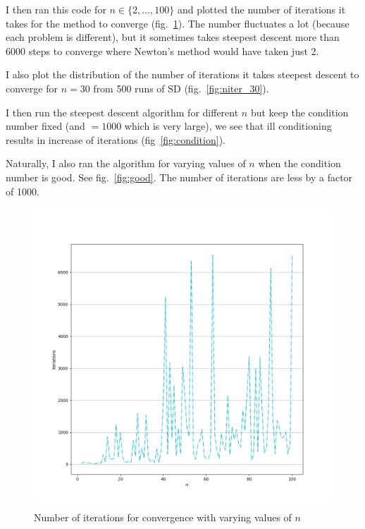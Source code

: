 \documentclass[11pt]{article}
\begin{document}
I then ran this code for $n\in\{2,\dotsc,100\}$ and plotted the number of iterations
it takes for the method to converge (fig.~\ref{fig:niter}). The number fluctuates
a lot (because each problem is different), but it sometimes takes steepest descent
more than 6000 steps to converge where Newton's method would have taken just 2.\par
I also plot the distribution of the number of iterations it takes steepest descent
to converge for $n=30$ from 500 runs of SD (fig.~\ref{fig:niter_30}).\par
I then run the steepest descent algorithm for different $n$ but keep the condition
number fixed (and $=1000$ which is very large), we see that ill conditioning results
in increase of iterations (fig~\ref{fig:condition}).\par
Naturally, I also ran the algorithm for varying values of $n$ when the condition
number is good. See fig.~\ref{fig:good}. The number of iterations are less by
a factor of 1000.\par
\begin{figure}[!htbp]
    \includegraphics[width=\textwidth]{./niter.png}
    \caption{Number of iterations for convergence with varying values of $n$\label{fig:niter}}
\end{figure}
\end{document}
